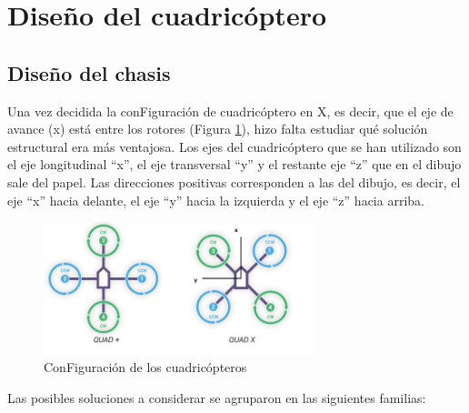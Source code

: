 \documentclass[12pt,twoside]{article}
\begin{document}
  \newpage
	\section{Diseño del cuadricóptero}\label{sec:diseno}


		\subsection{Diseño del chasis}\label{subsec:diseno_chasis}
Una vez decidida la conFiguración de cuadricóptero en X, es decir, que el eje de avance (x) está entre los rotores (Figura \ref{fig:conFiguracion_quad}), hizo falta estudiar qué solución estructural era más ventajosa. Los ejes del cuadricóptero que se han utilizado son el eje longitudinal “x”, el eje transversal “y” y el restante eje “z” que en el dibujo sale del papel. Las direcciones positivas corresponden a las del dibujo, es decir, el eje “x” hacia delante, el eje “y” hacia la izquierda y el eje “z” hacia arriba.

		\begin{figure}
			\centering
			\includegraphics[width=0.7\textwidth]{Imatges/Disseny_Chasis/Quad_eixos.png}
			\caption{ConFiguración de los cuadricópteros}
			\label{fig:conFiguracion_quad}
		\end{figure}
		
Las posibles soluciones a considerar se agruparon en las siguientes familias:
\end{document}
